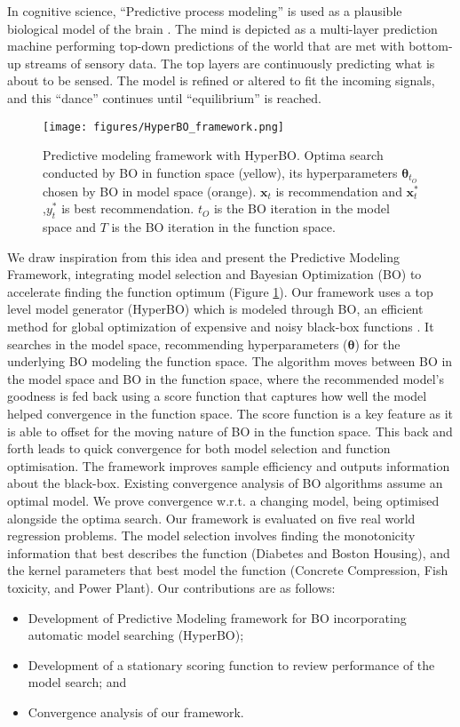 In cognitive science, “Predictive process modeling” is used as a plausible biological model of the brain \cite{Clark2013,Clark2015a}. The  mind is depicted as a multi-layer prediction machine performing top-down predictions of the world that are met with bottom-up streams of sensory data.  The top layers are continuously predicting what is about to be sensed. The model is refined or altered to fit the incoming signals, and this “dance” continues until “equilibrium” is reached. 

\begin{figure}[!tb]
	\begin{center}
		\texttt{[image: figures/HyperBO\_framework.png]}
	\end{center}
	\caption{Predictive modeling framework with HyperBO. Optima search conducted by BO in function space (yellow), its hyperparameters $\boldsymbol{\theta}_{t_{O}}$ chosen by BO in model space (orange).  $\boldsymbol{x}_{t}$ is recommendation and $\boldsymbol{x}^{*}_{t}$,$y^{*}_{t}$ is best recommendation. $t_O$ is the BO iteration in the model space and $T$ is the BO iteration in the function space.}
	\label{fig:HyerBO_framework}
\end{figure}

We draw inspiration from this idea and present the Predictive Modeling Framework, integrating model selection and Bayesian Optimization (BO) to accelerate finding the function optimum (Figure \ref{fig:HyerBO_framework}). Our framework uses a top level model generator (HyperBO) which is modeled through BO, an efficient method for global optimization of expensive and noisy black-box functions \cite{DBLP:journals/corr/abs-1012-2599,Snoek2012,Freitas2015}. It searches in the model space, recommending  hyperparameters ($\boldsymbol{\theta}$) for the underlying BO modeling the function space. The algorithm moves between BO in the model space and BO in the function space, where the recommended model's goodness is fed back using a score function that captures how well the model helped convergence in the function space. The score function is a key feature as it is able to offset for the moving nature of BO in the function space. This back and forth leads to quick convergence for both model selection and function optimisation. The framework improves sample efficiency and outputs information about the black-box. Existing convergence analysis of BO algorithms assume an optimal model. We prove convergence w.r.t. a changing model, being optimised alongside the optima search. Our framework is evaluated on five real world regression problems. The model selection involves finding the monotonicity information that best describes the function (Diabetes and Boston Housing), and the kernel parameters that best model the function (Concrete Compression, Fish toxicity, and Power Plant). Our contributions are as follows:

\begin{itemize}
	\item Development of Predictive Modeling framework for BO incorporating automatic model searching (HyperBO);
	\item Development of a stationary scoring function to review performance of the model search; and
	\item Convergence analysis of our framework.
\end{itemize}